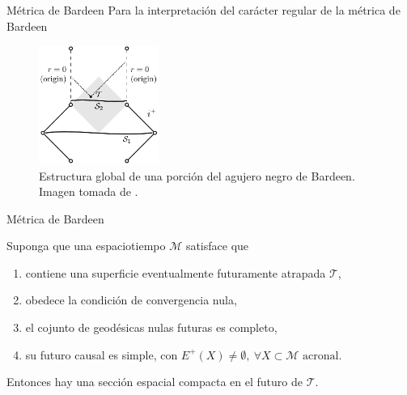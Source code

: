 \documentclass[t]{beamer}
\numberwithin{equation}{section}
\begin{document}
\begin{frame}{Métrica de Bardeen}
Para la interpretación del carácter regular de la métrica de Bardeen

\begin{figure}[h!]
	\centering
	\includegraphics[width=0.35\textwidth]{bardeenDiagram}
	\caption{Estructura global de una porción del agujero negro de Bardeen. Imagen tomada de \cite{borde1994}.}
	\label{fig: bardeen diagram}
\end{figure}
\end{frame}

\begin{frame}{Métrica de Bardeen}
\vspace{\fill}
\begin{theorem}[Borde, 1996]
	\label{borde reg thm}
	Suponga que una espaciotiempo $\mathcal{M}$ satisface que
	
	\begin{enumerate}[i]
		\item contiene una superficie eventualmente futuramente atrapada $\mathcal{T}$,
		
		\item obedece la condición de convergencia nula,
		
		\item el cojunto de geodésicas nulas futuras es completo,
		
		\item su futuro causal es simple, con $E^{+}(X) \neq \emptyset,\ \forall X \subset \mathcal{M} \text{\ acronal}$.
	\end{enumerate}
	
	Entonces hay una sección espacial compacta en el futuro de $\mathcal{T}$.
\end{theorem}
\vspace{\fill}
\end{frame}
\end{document}
